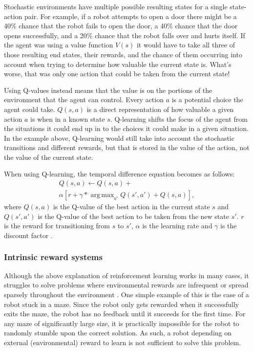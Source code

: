 \documentclass[letterpaper]{article} %
\DeclareMathOperator*{\argmax}{arg\,max}
\begin{document}
Stochastic environments have multiple possible resulting states for a single state-action pair. For example, if a robot attempts to open a door there might be a 40\% chance that the robot fails to open the door, a 40\% chance that the door opens successfully, and a 20\% chance that the robot falls over and hurts itself. If the agent was using a value function $V(s)$ it would have to take all three of those resulting end states, their rewards, and the chance of them occurring into account when trying to determine how valuable the current state is. What's worse, that was only one action that could be taken from the current state!

Using Q-values instead means that the value is on the portions of the environment that the agent can control. Every action $a$ is a potential choice the agent could take. $Q(s,a)$ is a direct representation of how valuable a given action $a$ is when in a known state $s$. Q-learning shifts the focus of the agent from the situations it could end up in to the choices it could make in a given situation. In the example above, Q-learning would still take into account the stochastic transitions and different rewards, but that is stored in the value of the action, not the value of the current state.

When using Q-learning, the temporal difference equation becomes as follows:
\begin{multline}
	Q(s,a) \leftarrow  Q(s,a) + \\ \alpha \left[r + \gamma *  \argmax_{a'} Q(s',a') + Q(s,a)\right],
	\label{eq:TDQVF}
\end{multline}
where $Q(s,a)$ is the Q-value of the best action in the current state $s$ and $Q(s',a')$ is the Q-value of the best action to be taken from the new state $s'$. $r$ is the reward for transitioning from $s$ to $s'$, $\alpha$ is the learning rate and $\gamma$ is the discount factor \cite{Ladosz_2022}.

\subsubsection{Intrinsic reward systems}
Although the above explanation of reinforcement learning works in many cases, it struggles to solve problems where environmental rewards are infrequent or spread sparsely throughout the environment \cite{DBLP:journals/corr/abs-1908-06976}
\cite{FToCFaIM:Jurgen}.
One simple example of this is the case of a robot stuck in a maze. Since the robot only gets rewarded when it successfully exits the maze, the robot has no feedback until it succeeds for the first time. For any maze of significantly large size, it is practically impossible for the robot to randomly stumble upon the correct solution. As such, a robot depending on external (environmental) reward to learn is not sufficient to solve this problem.
\end{document}
